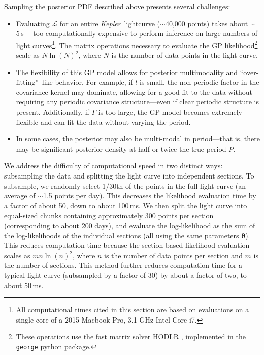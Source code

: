 \documentclass[useAMS, usenatbib, preprint, 12pt]{aastex}
\newcommand{\Kepler}{{\it Kepler}}
\begin{document}
Sampling the posterior PDF described above presents several challenges:
\begin{itemize}
\item Evaluating $\mathcal L$ for an entire \Kepler\ lightcurve
($\sim$40,000 points) takes about $\sim$5\,s--- too computationally expensive
to perform inference on large numbers of light curves\footnote{All
computational times cited in this section are based on evaluations on a
single core of a 2015 Macbook Pro, 3.1 GHz Intel Core i7.}.
The matrix operations necessary to evaluate the GP likelihood\footnote{These
operations use the fast matrix solver HODLR \citep{Ambikasaran2014},
implemented in the {\tt george} \citep{George} python package.} scale as
$N\ln(N)^2$, where $N$ is the number of data points in the light curve.

\item The flexibility of this GP model allows for posterior multimodality and
``over-fitting''--like behavior.
For example, if $l$ is small,  the non-periodic factor in the covariance
        kernel may dominate, allowing for a good fit to the data without
        requiring any periodic covariance structure---even if clear periodic
        structure is present.
Additionally, if $\Gamma$ is too large, the GP model becomes extremely
        flexible and can fit the data without varying the period.

\item In some cases, the posterior may also be multi-modal in period---that is,
there may be significant posterior density at half or twice the true period $P$.
\end{itemize}

We address the difficulty of computational speed in two distinct ways:
subsampling the data and splitting the light curve into independent sections.
To subsample, we randomly select 1/30th of the points in the full light curve
(an average of $\sim$1.5 points per day).
This decreases the likelihood evaluation time by a factor of about 50, down to
about 100\,ms.
We then split the light curve into equal-sized chunks containing approximately
300 points per section (corresponding to about 200 days), and evaluate the
log-likelihood as the sum of the log-likelihoods of the individual sections
(all using the same parameters ${\bm \theta}$).
This reduces computation time because the section-based likelihood evaluation
scales as $mn\ln(n)^2$, where $n$ is the number of data points per section and
$m$ is the number of sections.
This method further reduces computation time for a typical light curve
(subsampled by a factor of 30) by about a factor of two, to about 50\,ms.
\end{document}
